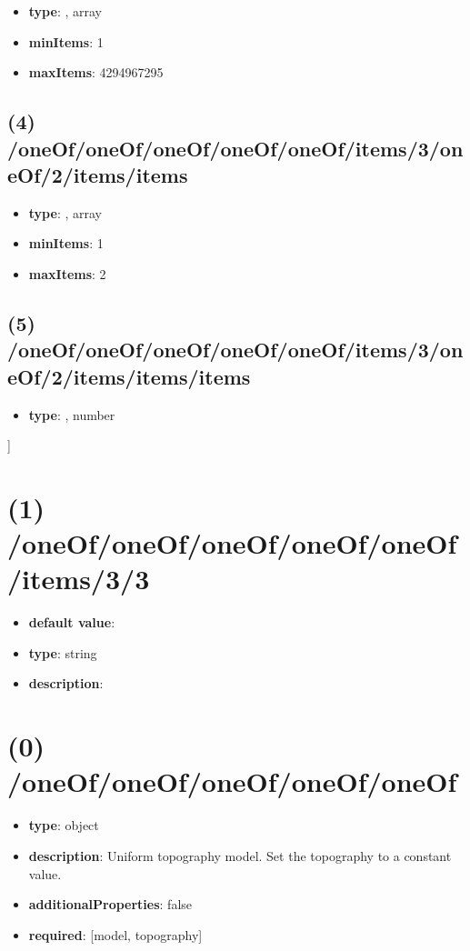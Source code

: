 \begin{itemize}[leftmargin=3em]\item {\bf type}: , array\item {\bf minItems}: 1
\item {\bf maxItems}: 4294967295
\end{itemize}\subsection{(4) /oneOf/oneOf/oneOf/oneOf/oneOf/items/3/oneOf/2/items/items}
\begin{itemize}[leftmargin=4em]\item {\bf type}: , array\item {\bf minItems}: 1
\item {\bf maxItems}: 2
\end{itemize}\subsection{(5) /oneOf/oneOf/oneOf/oneOf/oneOf/items/3/oneOf/2/items/items/items}
\begin{itemize}[leftmargin=5em]\item {\bf type}: , number\end{itemize}]\section{(1) /oneOf/oneOf/oneOf/oneOf/oneOf/items/3/3}
\begin{itemize}[leftmargin=1em]\item {\bf default value}: 
\item {\bf type}: string
\item {\bf description}: 
\end{itemize}\section{(0) /oneOf/oneOf/oneOf/oneOf/oneOf}
\begin{itemize}[leftmargin=0em]\item {\bf type}: object
\item {\bf description}: Uniform topography model. Set the topography to a constant value.
\item {\bf additionalProperties}: false
\item {\bf required}: [model, topography]\end{itemize}
